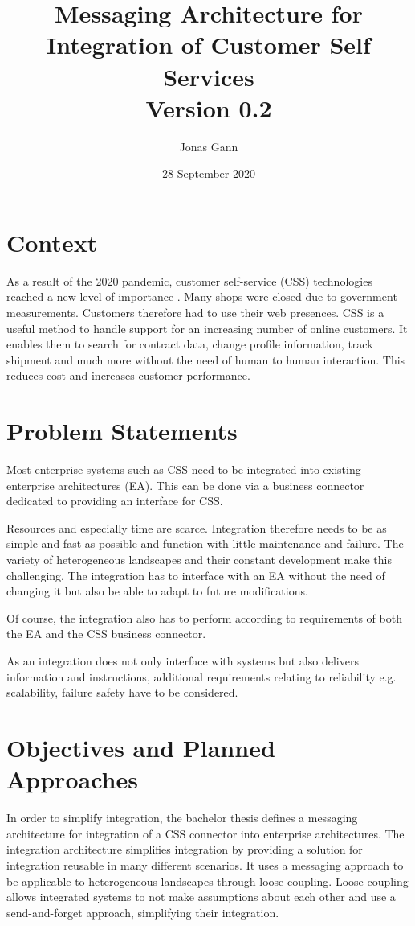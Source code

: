 \documentclass{article}
\title{Messaging Architecture for Integration of Customer Self Services \\ Version 0.2}
\author{Jonas Gann}
\date{28 September 2020}
\begin{document}
\maketitle

\section{Context}
As a result of the 2020 pandemic, customer self-service (CSS) technologies reached a new level of importance \cite{covid}.
Many shops were closed due to government measurements. Customers therefore had to use their web
presences. CSS is a useful method to handle support for an increasing number of online customers. It enables them to search 
for contract data, change profile information, track shipment and much more without the need of human to human interaction.
This reduces cost and increases customer performance.

\section{Problem Statements}

Most enterprise systems such as CSS need to be integrated into existing enterprise architectures (EA).
This can be done via a business connector dedicated to providing an interface for CSS. 

Resources and especially time are scarce. Integration therefore needs to be as simple and fast as possible and 
function with little maintenance and failure. The variety of heterogeneous landscapes and their constant 
development make this challenging. The integration has to interface with an EA without the need of changing it but also be able to 
adapt to future modifications.

Of course, the integration also has to perform according to requirements of both the EA and the CSS business connector.

As an integration does not only interface with systems but also delivers information and instructions, additional requirements 
relating to reliability e.g. scalability, failure safety have to be considered.

\section{Objectives and Planned Approaches}

In order to simplify integration, the bachelor thesis defines a messaging architecture for integration of a CSS connector 
into enterprise architectures. The integration architecture simplifies integration by providing a solution for integration 
reusable in many different scenarios. It uses a messaging approach to be applicable to heterogeneous landscapes through 
loose coupling. Loose coupling allows integrated systems to not make assumptions about each other and use a 
send-and-forget approach, simplifying their integration.
\end{document}
